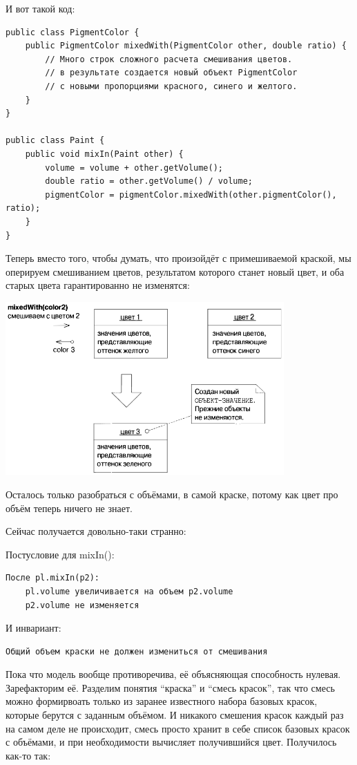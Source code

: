 \documentclass[a5paper]{article}
\begin{document}
И вот такой код:

\begin{verbatim}
public class PigmentColor {
    public PigmentColor mixedWith(PigmentColor other, double ratio) {
        // Много строк сложного расчета смешивания цветов.
        // в результате создается новый объект PigmentColor
        // с новыми пропорциями красного, синего и желтого.
    }
}

public class Paint {
    public void mixIn(Paint other) {
        volume = volume + other.getVolume();
        double ratio = other.getVolume() / volume;
        pigmentColor = pigmentColor.mixedWith(other.pigmentColor(), ratio);
    }
}
\end{verbatim}

Теперь вместо того, чтобы думать, что произойдёт с примешиваемой краской, мы оперируем смешиванием цветов, результатом которого станет новый цвет, и оба старых цвета гарантированно не изменятся:

\begin{center}
    \includegraphics[width=0.8\textwidth]{pigmentColorValueObject.png}
\end{center}

Осталось только разобраться с объёмами, в самой краске, потому как цвет про объём теперь ничего не знает.

Сейчас получается довольно-таки странно:

Постусловие для mixIn():
{\color{blue}
\begin{verbatim}
После pl.mixIn(p2):
    pl.volume увеличивается на объем p2.volume
    p2.volume не изменяется
\end{verbatim} }
И инвариант:
{\color{blue}
\begin{verbatim}
Общий объем краски не должен измениться от смешивания
\end{verbatim} }

Пока что модель вообще противоречива, её объясняющая способность нулевая. Зарефакторим её. Разделим понятия ``краска'' и ``смесь красок'', так что смесь можно формирвоать только из заранее известного набора базовых красок, которые берутся с заданным объёмом. И никакого смешения красок каждый раз на самом деле не происходит, смесь просто хранит в себе список базовых красок с объёмами, и при необходимости вычисляет получившийся цвет. Получилось как-то так:
\end{document}
